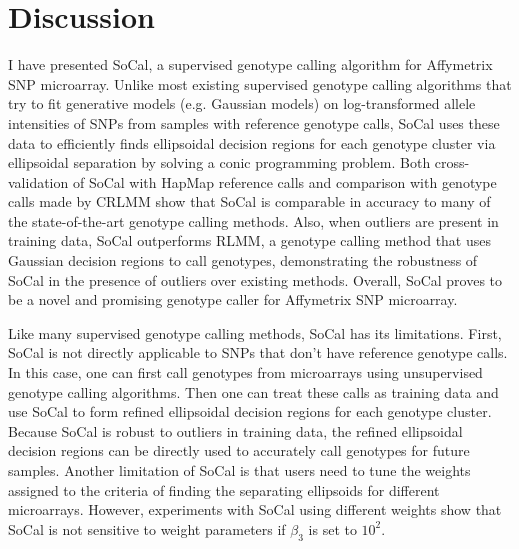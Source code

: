 \documentclass{scrartcl}
\begin{document}
\section{Discussion}

\par
I have presented SoCal, a supervised genotype calling algorithm for Affymetrix
SNP microarray.
Unlike most existing supervised genotype calling algorithms that try to fit
generative models (e.g. Gaussian models) on log-transformed allele
intensities of SNPs from samples with reference genotype calls,
SoCal uses these data to efficiently finds ellipsoidal decision regions for
each genotype cluster via ellipsoidal separation by solving a conic
programming problem.
Both cross-validation of SoCal with HapMap reference calls and comparison with
genotype calls made by CRLMM show that SoCal is comparable in accuracy to many
of the state-of-the-art genotype calling methods.
Also, when outliers are present in training data, SoCal outperforms RLMM, a
genotype calling method that uses Gaussian decision regions to call genotypes,
demonstrating the robustness of SoCal in the presence of outliers over
existing methods.
Overall, SoCal proves to be a novel and promising genotype caller for
Affymetrix SNP microarray.

\par
Like many supervised genotype calling methods, SoCal has its limitations.
First, SoCal is not directly applicable to SNPs that don't have
reference genotype calls.
In this case, one can first call genotypes from microarrays using
unsupervised genotype calling algorithms.
Then one can treat these calls as training data and use SoCal to
form refined ellipsoidal decision regions for each genotype cluster.
Because SoCal is robust to outliers in training data, the refined
ellipsoidal decision regions can be directly used to accurately call genotypes
for future samples.
Another limitation of SoCal is that users need to tune the weights
assigned to the criteria of finding the separating ellipsoids
for different microarrays.
However, experiments with SoCal using different weights show that SoCal is not
sensitive to weight parameters if $\beta_3$ is set to $10^2$.
\end{document}
